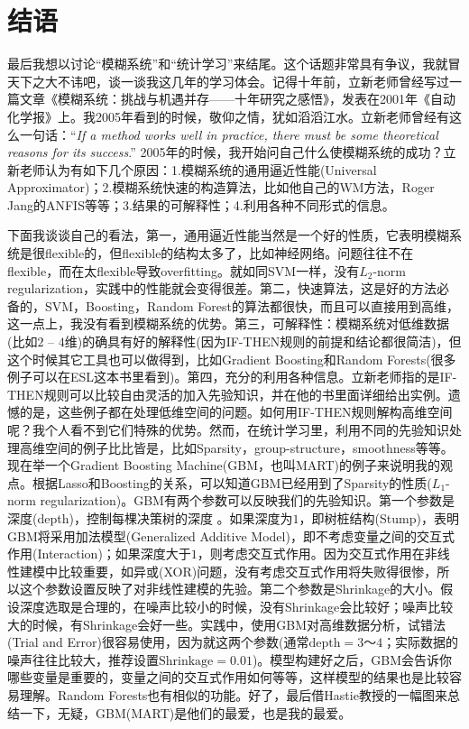 \documentclass{cosart-xetex}
\begin{document}
\section{结语}
最后我想以讨论“模糊系统”和“统计学习”来结尾。这个话题非常具有争议，我就冒天下之大不讳吧，谈一谈我这几年的学习体会。记得十年前，立新老师曾经写过一篇文章《模糊系统：挑战与机遇并存——十年研究之感悟》，发表在2001年《自动化学报》上。我2005年看到的时候，敬仰之情，犹如滔滔江水。立新老师曾经有这么一句话：“\textit{If a method works well in practice, there must be some theoretical reasons for its success}.” 2005年的时候，我开始问自己什么使模糊系统的成功？立新老师认为有如下几个原因：1.模糊系统的通用逼近性能(Universal Approximator)；2.模糊系统快速的构造算法，比如他自己的WM方法，Roger Jang的ANFIS等等；3.结果的可解释性；4.利用各种不同形式的信息。

下面我谈谈自己的看法，第一，通用逼近性能当然是一个好的性质，它表明模糊系统是很flexible的，但flexible的结构太多了，比如神经网络。问题往往不在flexible，而在太flexible导致overfitting。就如同SVM一样，没有$L_2$-norm regularization，实践中的性能就会变得很差。第二，快速算法，这是好的方法必备的，SVM，Boosting，Random Forest的算法都很快，而且可以直接用到高维，这一点上，我没有看到模糊系统的优势。第三，可解释性：模糊系统对低维数据(比如$2$ -- $4$维)的确具有好的解释性(因为IF-THEN规则的前提和结论都很简洁)，但这个时候其它工具也可以做得到，比如Gradient Boosting和Random Forests(很多例子可以在ESL这本书里看到)。第四，充分的利用各种信息。立新老师指的是IF-THEN规则可以比较自由灵活的加入先验知识，并在他的书里面详细给出实例。遗憾的是，这些例子都在处理低维空间的问题。如何用IF-THEN规则解构高维空间呢？我个人看不到它们特殊的优势。然而，在统计学习里，利用不同的先验知识处理高维空间的例子比比皆是，比如Sparsity，group-structure，smoothness等等。现在举一个Gradient Boosting  Machine(GBM，也叫MART)的例子来说明我的观点。根据Lasso和Boosting的关系，可以知道GBM已经用到了Sparsity的性质($L_1$-norm regularization)。GBM有两个参数可以反映我们的先验知识。第一个参数是深度(depth)，控制每棵决策树的深度 。如果深度为$1$，即树桩结构(Stump)，表明GBM将采用加法模型(Generalized Additive Model)，即不考虑变量之间的交互式作用(Interaction)；如果深度大于$1$，则考虑交互式作用。因为交互式作用在非线性建模中比较重要，如异或(XOR)问题，没有考虑交互式作用将失败得很惨，所以这个参数设置反映了对非线性建模的先验。第二个参数是Shrinkage的大小。假设深度选取是合理的，在噪声比较小的时候，没有Shrinkage会比较好；噪声比较大的时候，有Shrinkage会好一些。实践中，使用GBM对高维数据分析，试错法(Trial and Error)很容易使用，因为就这两个参数(通常$\text{depth} = 3 \text{～} 4$；实际数据的噪声往往比较大，推荐设置$\text{Shrinkage} = 0.01$)。模型构建好之后，GBM会告诉你哪些变量是重要的，变量之间的交互式作用如何等等，这样模型的结果也是比较容易理解。Random Forests也有相似的功能。好了，最后借Hastie教授的一幅图来总结一下，无疑，GBM(MART)是他们的最爱，也是我的最爱。
\end{document}

